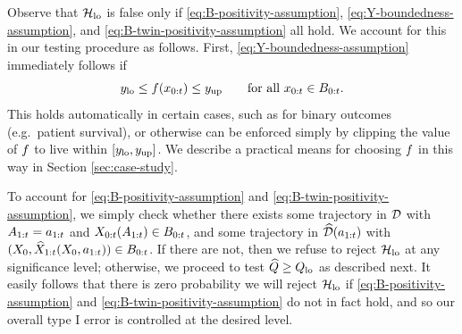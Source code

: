 


Observe that $\mathcal{H}_{\mathrm{lo}}$ is false only if \eqref{eq:B-positivity-assumption}, \eqref{eq:Y-boundedness-assumption}, and \eqref{eq:B-twin-positivity-assumption} all hold.
We account for this in our testing procedure as follows.
First, \eqref{eq:Y-boundedness-assumption} immediately follows if 
\begin{equation} \label{eq:fx-boundedness-assumption}
    y_{\mathrm{lo}} \leq f(x_{0:t}) \leq y_{\mathrm{up}} \qquad \text{for all $x_{0:t} \in B_{0:t}$.}
\end{equation}
This holds automatically in certain cases, such as for binary outcomes (e.g.\ patient survival), or otherwise can be enforced simply by clipping the value of $f$ to live within $[y_{\mathrm{lo}}, y_{\mathrm{up}}]$.
We describe a practical means for choosing $f$ in this way in Section \ref{sec:case-study}.

To account for \eqref{eq:B-positivity-assumption} and \eqref{eq:B-twin-positivity-assumption}, we simply check whether there exists some trajectory in $\mathcal{D}$ with $A_{1:t} = a_{1:t}$ and $X_{0:t}(A_{1:t}) \in B_{0:t}$, and some trajectory in $\widehat{\mathcal{D}}(a_{1:t})$ with $(X_0, \widehat{X}_{1:t}(X_0, a_{1:t})) \in B_{0:t}$.
If there are not, then we refuse to reject $\mathcal{H}_{\mathrm{lo}}$ at any significance level; otherwise, we proceed to test $\widehat{Q} \geq Q_{\mathrm{lo}}$ as described next.
It easily follows that there is zero probability we will reject $\mathcal{H}_{\mathrm{lo}}$ if \eqref{eq:B-positivity-assumption} and \eqref{eq:B-twin-positivity-assumption} do not in fact hold, and so our overall type I error is controlled at the desired level.

